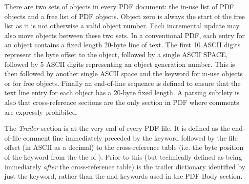 There are two sets of
objects in every PDF document: the in-use list of PDF objects and a free list
of PDF objects. Object zero is always the start of the free list as it is not
otherwise a valid object number. Each incremental update may also move objects between these two sets.
In a conventional PDF, each entry for an object contains a fixed length 20-byte line of text.
The first 10 ASCII digits represent the byte offset to the object, followed by a single ASCII SPACE, 
followed by 5 ASCII digits representing an object generation number. This is then followed by
another single ASCII space and the keyword  for in-use objects or  for free objects.
Finally an end-of-line sequence is defined to ensure that the text line entry for each object has 
a 20-byte fixed length. A parsing subtlety is also that cross-reference sections are the only section 
in PDF where comments are expressly prohibited.

The \emph{Trailer} section is at the very end of every PDF file. 
It is defined as the end-of-file comment line  immediately
preceded by the  keyword followed by the file offset (in ASCII as a decimal) to 
the cross-reference table (i.e. the byte position of the  keyword 
from the the \lstcd{\%} of ). Prior to this (but technically 
defined as being immediately \emph{after} the cross-reference table) is the trailer dictionary
identified by just the  keyword, rather than the  and 
keywords used in the PDF Body section.


